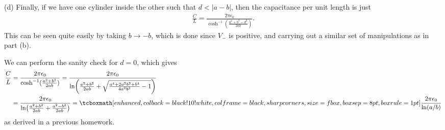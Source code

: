 {(d) Finally, if we have one cylinder inside the other such that $d < |a - b|$, then the capacitance per unit length is just
\begin{eqnarray}
    \frac{C}{L} = \frac{2 \pi \epsilon_0}{\cosh^{-1}(\frac{a^2 + b^2 - d^2}{2 a b})}
.\end{eqnarray}
This can be seen quite easily by taking $b \rightarrow -b$, which is done since $V_{-}$ is positive, and carrying out a similar set of manipulations as in part (b).

We can perform the sanity check for $d = 0$, which gives
\begin{eqnarray}
    \begin{aligned}
        \frac{C}{L} &= \frac{2 \pi \epsilon_0}{\cosh^{-1}(\frac{a^2 + b^2}{2ab})} = \frac{2 \pi \epsilon_0}{\ln(\frac{a^2 + b^2}{2ab} + \sqrt{\frac{a^{4} + 2 a^2 b^2 + b^{4}}{4 a^2 b^2} - 1})} \\
                    &= \frac{2 \pi \epsilon_0}{\ln(\frac{a^2 + b^2}{2ab} + \frac{a^2 - b^2}{2ab})} = \eqbox{ \frac{2 \pi \epsilon_0}{\ln(a/b)} }
    \end{aligned}
\end{eqnarray}
as derived in a previous homework.

}



